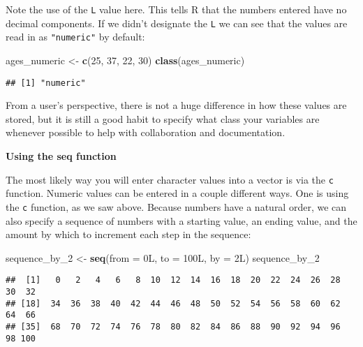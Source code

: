 \documentclass[]{tufte-book}
\newenvironment{Shaded}{\begin{snugshade}}{\end{snugshade}}
\newcommand{\DataTypeTok}[1]{\textcolor[rgb]{0.13,0.29,0.53}{#1}}
\newcommand{\DecValTok}[1]{\textcolor[rgb]{0.00,0.00,0.81}{#1}}
\newcommand{\KeywordTok}[1]{\textcolor[rgb]{0.13,0.29,0.53}{\textbf{#1}}}
\newcommand{\NormalTok}[1]{#1}
\newcommand{\StringTok}[1]{\textcolor[rgb]{0.31,0.60,0.02}{#1}}
\begin{document}
Note the use of the \texttt{L} value here. This tells R that the numbers entered have no decimal components. If we didn't designate the \texttt{L} we can see that the values are read in as \texttt{"numeric"} by default:

\begin{Shaded}
\begin{Highlighting}[]
\NormalTok{ages\_numeric <{-}}\StringTok{ }\KeywordTok{c}\NormalTok{(}\DecValTok{25}\NormalTok{, }\DecValTok{37}\NormalTok{, }\DecValTok{22}\NormalTok{, }\DecValTok{30}\NormalTok{)}
\KeywordTok{class}\NormalTok{(ages\_numeric)}
\end{Highlighting}
\end{Shaded}

\begin{verbatim}
## [1] "numeric"
\end{verbatim}

From a user's perspective, there is not a huge difference in how these values are stored, but it is still a good habit to specify what class your variables are whenever possible to help with collaboration and documentation. \newline

\vspace*{0.2in}

\noindent\textbf{Using the seq function}\vspace*{0.1in}

The most likely way you will enter character values into a vector is via the \texttt{c} function. Numeric values can be entered in a couple different ways. One is using the \texttt{c} function, as we saw above. Because numbers have a natural order, we can also specify a sequence of numbers with a starting value, an ending value, and the amount by which to increment each step in the sequence:

\begin{Shaded}
\begin{Highlighting}[]
\NormalTok{sequence\_by\_}\DecValTok{2}\NormalTok{ <{-}}\StringTok{ }\KeywordTok{seq}\NormalTok{(}\DataTypeTok{from =}\NormalTok{ 0L, }\DataTypeTok{to =}\NormalTok{ 100L, }\DataTypeTok{by =}\NormalTok{ 2L)}
\NormalTok{sequence\_by\_}\DecValTok{2}
\end{Highlighting}
\end{Shaded}

\begin{verbatim}
##  [1]   0   2   4   6   8  10  12  14  16  18  20  22  24  26  28  30  32
## [18]  34  36  38  40  42  44  46  48  50  52  54  56  58  60  62  64  66
## [35]  68  70  72  74  76  78  80  82  84  86  88  90  92  94  96  98 100
\end{verbatim}
\end{document}
